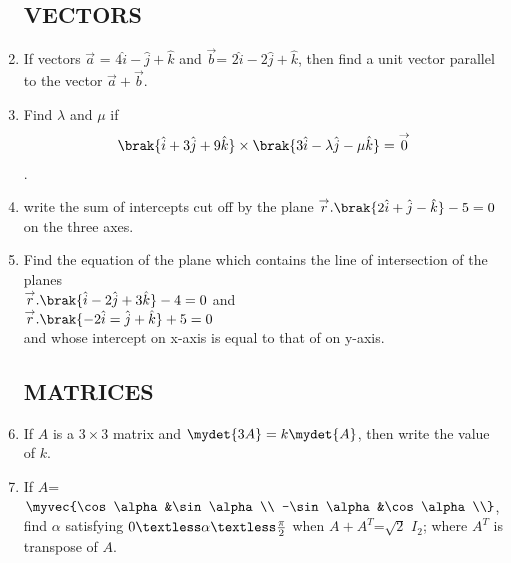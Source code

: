 \documentclass[12pt, -letter paper]{article}
\begin{document}
\begin{enumerate}

 
		\subsection*{VECTORS}

	\item If vectors $\overset{\rightarrow}{a}$ = $4\hat{i} - \hat{j} + \hat{k}$ and $\overset{\rightarrow}{b} $= $ 2\hat{i} - 2\hat{j} + \hat{k}$, then find a unit vector parallel to the vector $\overset{\rightarrow}{a} + \overset{\rightarrow}{b}$.

	\item Find $\lambda$ and $\mu$ if \begin{align*}\brak{\hat{i} +3\hat{j} + 9\hat{k}} \times \brak{3\hat{i} - \lambda \hat{j} - \mu \hat{k}} =\overset\rightarrow 0\end{align*}.
  

 \item  write the sum of intercepts cut off by the plane $\overset{\rightarrow}{r}. \brak{2\hat{i}+\hat{j}-\hat{k}}-5=0$ on the three axes.

\item Find the equation of the plane which contains the line
    of intersection of the planes\\                            $\overset{\rightarrow}{r}.\brak{\hat{i}-2\hat{j}+3\hat{k}}-4=0$ and \\ $\overset{\rightarrow}{r}.\brak{-2\hat{i}=\hat{j}+\hat{k}}+5=0$\\ and whose intercept on x-axis is equal to that of on y-axis.



   \subsection*{MATRICES}

\item If $A$ is a $3\times3$ matrix and $\mydet{3A}=k\mydet{A}$, then     write the value of $k$.

\item If $A$=$\myvec{\cos\alpha&\sin\alpha\\                           -\sin\alpha&\cos\alpha\\}$, find $\alpha$ satisfying $0  \textless\alpha\textless\frac{\pi}{2}$ when $A+A^T$=$\sqrt{2}$ $I_{2}$; where $A^T$ is transpose of $A$.




\end{enumerate}
\end{document}
